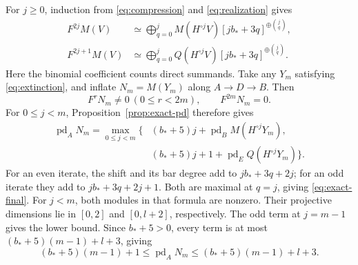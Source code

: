\documentclass[11pt]{article}
\numberwithin{equation}{section}
\theoremstyle{definition}
\theoremstyle{remark}
\DeclareMathOperator{\pd}{pd}
\begin{document}
For $j\ge0$, induction from \eqref{eq:compression} and
\eqref{eq:realization} gives
\begin{align}
F^{2j}M(V)&\simeq\bigoplus_{q=0}^{j}
 M(H^{\circ j}V)[jb_*+3q]^{\oplus\binom jq},\label{eq:even-iterates}\\
F^{2j+1}M(V)&\simeq\bigoplus_{q=0}^{j}
 Q(H^{\circ j}V)[jb_*+3q]^{\oplus\binom jq}.\label{eq:odd-iterates}
\end{align}
Here the binomial coefficient counts direct summands.
Take any $Y_m$ satisfying \eqref{eq:extinction}, and inflate
$N_m=M(Y_m)$ along $A\to D\to B$. Then
\[
F^rN_m\ne0\ (0\le r<2m),\qquad F^{2m}N_m=0.
\]
For $0\le j<m$, Proposition~\ref{prop:exact-pd} therefore gives
\begin{equation}\label{eq:exact-final}
\begin{split}
\pd_A N_m=\max_{0\le j<m}\bigl\{
 &(b_*+5)j+\pd_B M(H^{\circ j}Y_m),\\
 &(b_*+5)j+1+\pd_E Q(H^{\circ j}Y_m)\bigr\}.
\end{split}
\end{equation}
For an even iterate, the shift and its bar degree add to
$jb_*+3q+2j$; for an odd iterate they add to $jb_*+3q+2j+1$.
Both are maximal at $q=j$, giving \eqref{eq:exact-final}.
For $j<m$, both modules in that formula are nonzero. Their projective
dimensions lie in $[0,2]$ and $[0,l+2]$, respectively. The odd term
at $j=m-1$ gives the lower bound. Since $b_*+5>0$, every term is at
most $(b_*+5)(m-1)+l+3$, giving
\begin{equation}\label{eq:linear-bounds}
(b_*+5)(m-1)+1\le\pd_A N_m\le(b_*+5)(m-1)+l+3.
\end{equation}
\end{document}
